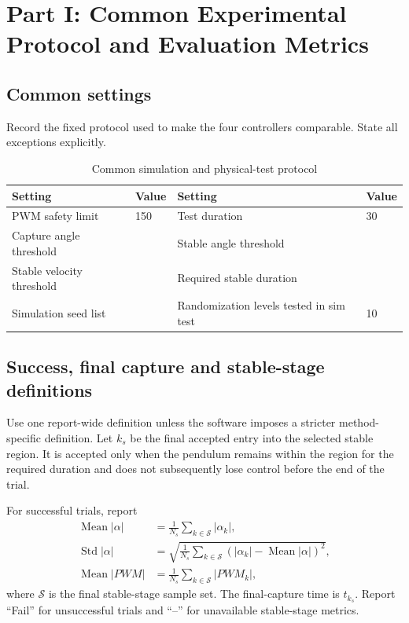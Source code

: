 \documentclass[11pt,a4paper]{article}
\begin{document}
\section{Part I: Common Experimental Protocol and Evaluation Metrics}
\label{sec:common}

\subsection{Common settings}

Record the fixed protocol used to make the four controllers comparable. State
all exceptions explicitly.

\begin{table}[H]
\centering
\caption{Common simulation and physical-test protocol}
\label{tab:commonsettings}
\small
\begin{tabular}{ll@{\qquad}ll}
\toprule
Setting & Value & Setting & Value\\
\midrule

PWM safety limit & 150 &Test duration & 30\\
Capture angle threshold & & Stable angle threshold & \\
Stable velocity threshold & & Required stable duration & \\
Simulation seed list & & Randomization levels tested in sim test & 10\\
\bottomrule
\end{tabular}
\end{table}





\subsection{Success, final capture and stable-stage definitions}

Use one report-wide definition unless the software imposes a stricter method-
specific definition. Let $k_s$ be the final accepted entry into the selected
stable region. It is accepted only when the pendulum remains within the region
for the required duration and does not subsequently lose control before the end
of the trial.

For successful trials, report
\begin{align}
\operatorname{Mean}|\alpha|
&=\frac{1}{N_s}\sum_{k\in\mathcal S}|\alpha_k|,\\
\operatorname{Std}|\alpha|
&=\sqrt{\frac{1}{N_s}\sum_{k\in\mathcal S}
\left(|\alpha_k|-\operatorname{Mean}|\alpha|\right)^2},\\
\operatorname{Mean}|PWM|
&=\frac{1}{N_s}\sum_{k\in\mathcal S}|PWM_k|,
\end{align}
where $\mathcal S$ is the final stable-stage sample set. The final-capture time
is $t_{k_s}$. Report ``Fail'' for unsuccessful trials and ``--'' for unavailable
stable-stage metrics.
\end{document}
